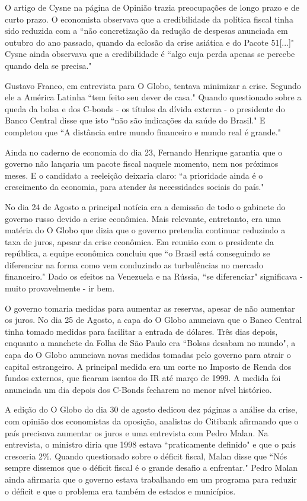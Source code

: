 \documentclass{article}
\begin{document}
O artigo de Cysne na página de Opinião trazia preocupações de longo prazo e de curto prazo. O economista observava que a credibilidade da política fiscal tinha sido reduzida com a ``não concretização da redução de despesas anunciada em outubro do ano passado, quando da eclosão da crise asiática e do Pacote 51[...]" Cysne ainda observava que a credibilidade é ``algo cuja perda apenas se percebe quando dela se precisa." %

Gustavo Franco, em entrevista para O Globo, tentava minimizar a crise. Segundo ele a América Latinha ``tem feito seu dever de casa." Quando questionado sobre a queda da bolsa e dos C-bonds - os títulos da dívida externa - o presidente do Banco Central disse que isto ``não são indicações da saúde do Brasil." E completou que ``A distância entre mundo financeiro e mundo real é grande." 

Ainda no caderno de economia do dia 23, Fernando Henrique garantia que o governo não lançaria um pacote fiscal naquele momento, nem nos próximos meses. E o candidato a reeleição deixaria claro: ``a prioridade ainda é o crescimento da economia, para atender às necessidades sociais do país."

No dia 24 de Agosto a principal notícia era a demissão de todo o gabinete do governo russo devido a crise econômica. Mais relevante, entretanto, era uma matéria do O Globo que dizia que o governo pretendia continuar reduzindo a taxa de juros, apesar da crise econômica. Em reunião com o presidente da república, a equipe econômica concluiu que ``o Brasil está conseguindo se diferenciar na forma como vem conduzindo as turbulências no mercado financeiro." Dado os efeitos na Venezuela e na Rússia, ``se diferenciar" significava - muito provavelmente - ir bem.

O governo tomaria medidas para aumentar as reservas, apesar de não aumentar os juros. No dia 25 de Agosto, a capa do O Globo anunciava que o Banco Central tinha tomado medidas para facilitar a entrada de dólares. Três dias depois, enquanto a manchete da Folha de São Paulo era ``Bolsas desabam no mundo", a capa do O Globo anunciava novas medidas tomadas pelo governo para atrair o capital estrangeiro. A principal medida era um corte no Imposto de Renda dos fundos externos, que ficaram isentos do IR até março de 1999. A medida foi anunciada um dia depois dos C-Bonds fecharem no menor nível histórico.          

A edição do O Globo do dia 30 de agosto dedicou dez páginas a análise da crise, com opinião dos economistas da oposição, analistas do Citibank afirmando que o país precisava aumentar os juros e uma entrevista com Pedro Malan. Na entrevista, o ministro diria que 1998 estava ``praticamente definido" e que o país cresceria 2\%. Quando questionado sobre o déficit fiscal, Malan disse que ``Nós sempre dissemos que o déficit fiscal é o grande desafio a enfrentar." Pedro Malan ainda afirmaria que o governo estava trabalhando em um programa para reduzir o déficit e que o problema era também de estados e municípios.
\end{document}
